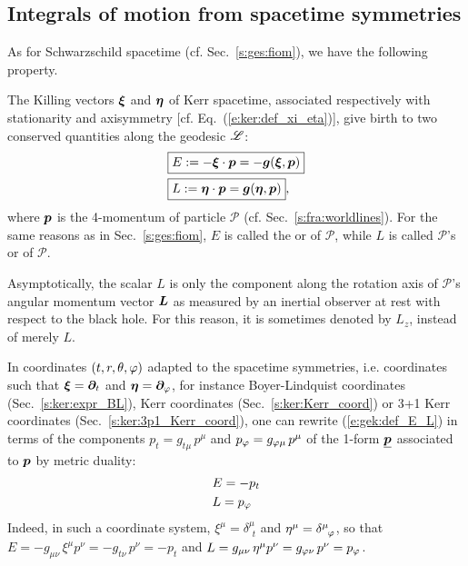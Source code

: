\subsection{Integrals of motion from spacetime symmetries} \label{s:gek:int_motion_sym}

As for Schwarzschild spacetime (cf. Sec.~\ref{s:ges:fiom}), we have the following
property.
\begin{greybox}
The Killing vectors $\bm{\xi}$ and $\bm{\eta}$ of Kerr spacetime,
associated respectively with
stationarity and axisymmetry [cf. Eq.~(\ref{e:ker:def_xi_eta})],
give birth to two conserved quantities
along the geodesic $\mathscr{L}$:
\begin{subequations}
\label{e:gek:def_E_L}
\begin{align}
& \fbox{$\displaystyle E := - \bm{\xi}\cdot \bm{p} = - \bm{g}(\bm{\xi},\bm{p}) $} \label{e:gek:def_E} \\
& \fbox{$\displaystyle L := \bm{\eta}\cdot \bm{p} = \bm{g}(\bm{\eta},\bm{p}) $} , \label{e:gek:def_L}
\end{align}
\end{subequations}
where $\bm{p}$ is the 4-momentum of particle $\mathscr{P}$ (cf. Sec.~\ref{s:fra:worldlines}).
For the same reasons as in Sec.~\ref{s:ges:fiom}, $E$ is called
the 
or  of $\mathscr{P}$,
while $L$ is called $\mathscr{P}$'s 
or 
of $\mathscr{P}$.
\end{greybox}
\begin{remark}
Asymptotically, the scalar $L$ is only the
component along the rotation axis of $\mathscr{P}$'s angular momentum vector $\bm{L}$
as measured by an inertial observer at rest with respect to the black hole.
For this reason, it is sometimes denoted by $L_z$, instead of merely $L$.
\end{remark}

In coordinates $(t,r,\theta,\varphi)$ adapted to the spacetime symmetries,
i.e. coordinates such that $\bm{\xi} = \bm{\partial}_t$ and $\bm{\eta}=\bm{\partial}_\varphi$,
for instance Boyer-Lindquist coordinates (Sec.~\ref{s:ker:expr_BL}),
Kerr coordinates (Sec.~\ref{s:ker:Kerr_coord}) or 3+1 Kerr coordinates
(Sec.~\ref{s:ker:3p1_Kerr_coord}), one can rewrite
(\ref{e:gek:def_E_L})
in terms of the components $p_t = g_{t\mu} \, p^\mu$ and $p_\varphi = g_{\varphi\mu} \, p^\mu$
of the 1-form $\underline{\bm{p}}$ associated to $\bm{p}$ by metric duality:
\begin{subequations}
\label{e:gek:E_pt_L_pph}
\begin{align}
& E = - p_t \\
& L = p_\varphi
\end{align}
\end{subequations}
Indeed, in such a coordinate system, $\xi^\mu =  \delta^\mu_{\ \, t}$
and $\eta^\mu = \delta^\mu_{\ \, \varphi}$, so that $E = -g_{\mu\nu} \, \xi^\mu p^\nu = -g_{t\nu} \, p^\nu = -p_t$
and $L = g_{\mu\nu} \, \eta^\mu p^\nu = g_{\varphi\nu} \, p^\nu = p_\varphi$.

